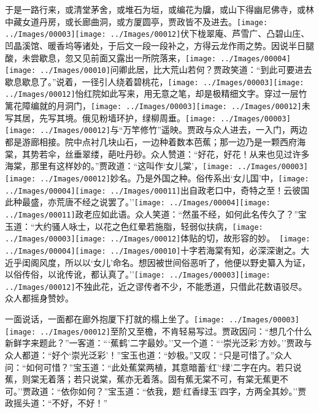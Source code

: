 于是一路行来，或清堂茅舍，或堆石为垣，或编花为牖，或山下得幽尼佛寺，或林中藏女道丹房，或长廊曲洞，或方厦圆亭，贾政皆不及进去。{\texttt{[image: ../Images/00003]}\texttt{[image: ../Images/00012]}\footnotesize \kaishu 伏下栊翠庵、芦雪广、凸碧山庄、凹晶溪馆、暖香坞等诸处，于后文一段一段补之，方得云龙作雨之势。}因说半日腿酸，未尝歇息，忽又见前面又露出一所院落来，{\texttt{[image: ../Images/00004]}\texttt{[image: ../Images/00010]}\footnotesize \kaishu 问卿此居，比大荒山若何？}贾政笑道：``到此可要进去歇息歇息了。''说着，一径引人绕着碧桃花，{\texttt{[image: ../Images/00003]}\texttt{[image: ../Images/00012]}\footnotesize \kaishu 怡红院如此写来，用无意之笔，却是极精细文字。}穿过一层竹篱花障编就的月洞门，{\texttt{[image: ../Images/00003]}\texttt{[image: ../Images/00012]}\footnotesize \kaishu 未写其居，先写其境。}俄见粉墙环护，绿柳周垂。{\texttt{[image: ../Images/00003]}\texttt{[image: ../Images/00012]}\footnotesize \kaishu 与``万竿修竹''遥映。}贾政与众人进去，一入门，两边都是游廊相接。院中点衬几块山石，一边种着数本芭蕉；那一边乃是一颗西府海棠，其势若伞，丝垂翠缕，葩吐丹砂。众人赞道：``好花，好花！从来也见过许多海棠，那里有这样妙的。''贾政道：``这叫作`女儿棠'，{\texttt{[image: ../Images/00003]}\texttt{[image: ../Images/00012]}\footnotesize \kaishu 妙名。}乃是外国之种。俗传系出`女儿国'中，{\texttt{[image: ../Images/00004]}\texttt{[image: ../Images/00011]}\footnotesize \kaishu 出自政老口中，奇特之至！}云彼国此种最盛，亦荒唐不经之说罢了。''{\texttt{[image: ../Images/00004]}\texttt{[image: ../Images/00011]}\footnotesize \kaishu 政老应如此语。}众人笑道：``然虽不经，如何此名传久了？''宝玉道：``大约骚人咏士，以花之色红晕若施脂，轻弱似扶病，{\texttt{[image: ../Images/00003]}\texttt{[image: ../Images/00012]}\footnotesize \kaishu 体贴的切，故形容的妙。　{\texttt{[image: ../Images/00004]}\texttt{[image: ../Images/00010]}\footnotesize \kaishu 十字若海棠有知，必深深谢之。}}大近乎闺阁风度，所以以`女儿'命名。想因被世间俗恶听了，他便以野史纂入为证，以俗传俗，以讹传讹，都认真了。''{\texttt{[image: ../Images/00003]}\texttt{[image: ../Images/00012]}\footnotesize \kaishu 不独此花，近之谬传者不少，不能悉道，只借此花数语驳尽。}众人都摇身赞妙。

一面说话，一面都在廊外抱厦下打就的榻上坐了。{\texttt{[image: ../Images/00003]}\texttt{[image: ../Images/00012]}\footnotesize \kaishu 至阶又至檐，不肯轻易写过。}贾政因问：``想几个什么新鲜字来题此？''一客道：```蕉鹤'二字最妙。''又一个道：```崇光泛彩'方妙。''贾政与众人都道：``好个`崇光泛彩'！''宝玉也道：``妙极。''又叹：``只是可惜了。''众人问：``如何可惜？''宝玉道：``此处蕉棠两植，其意暗蓄`红'`绿'二字在内。若只说蕉，则棠无着落；若只说棠，蕉亦无着落。固有蕉无棠不可，有棠无蕉更不可。''贾政道：``依你如何？''宝玉道：``依我，题`红香绿玉'四字，方两全其妙。''贾政摇头道：``不好，不好！''

